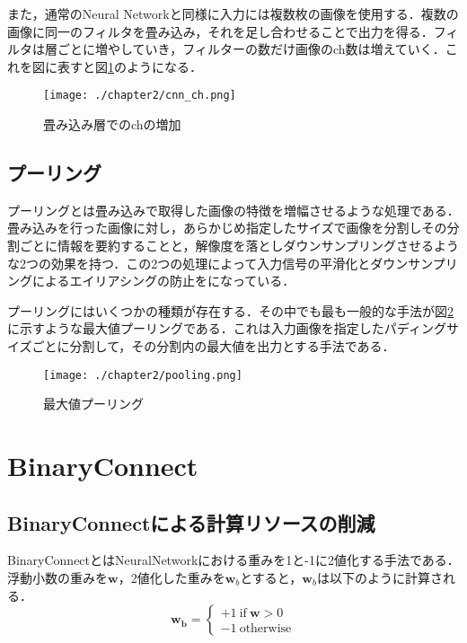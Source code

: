 また，通常のNeural Networkと同様に入力には複数枚の画像を使用する．複数の画像に同一のフィルタを畳み込み，それを足し合わせることで出力を得る．フィルタは層ごとに増やしていき，フィルターの数だけ画像のch数は増えていく．これを図に表すと図\ref{fig_cnn_ch}のようになる．
\begin{figure}[htbp]
  \begin{center}
    \texttt{[image: ./chapter2/cnn\_ch.png]}
    \caption{畳み込み層でのchの増加}
    \label{fig_cnn_ch}
  \end{center}
\end{figure}

\subsection{プーリング}
プーリングとは畳み込みで取得した画像の特徴を増幅させるような処理である．畳み込みを行った画像に対し，あらかじめ指定したサイズで画像を分割しその分割ごとに情報を要約することと，解像度を落としダウンサンプリングさせるような2つの効果を持つ．この2つの処理によって入力信号の平滑化とダウンサンプリングによるエイリアシングの防止をになっている．

プーリングにはいくつかの種類が存在する．その中でも最も一般的な手法が図\ref{fig_pooling}に示すような最大値プーリングである．これは入力画像を指定したパディングサイズごとに分割して，その分割内の最大値を出力とする手法である．
\begin{figure}[htbp]
  \begin{center}
    \texttt{[image: ./chapter2/pooling.png]}
    \caption{最大値プーリング}
    \label{fig_pooling}
  \end{center}
\end{figure}


\section{BinaryConnect}
\subsection{BinaryConnectによる計算リソースの削減}
BinaryConnectとはNeuralNetworkにおける重みを1と-1に2値化する手法である．浮動小数の重みを$\bm{w}$，2値化した重みを$\bm{w}_b$とすると，$\bm{w}_b$は以下のように計算される．
\begin{displaymath}
  \bm{w_{b}} = \left\{ \begin{array}{l}
  \displaystyle 
  +1\:  \text{if}\:  \bm{w} > 0 \\
  -1\:\text{otherwise}
  \end{array} \right.
\end{displaymath}


